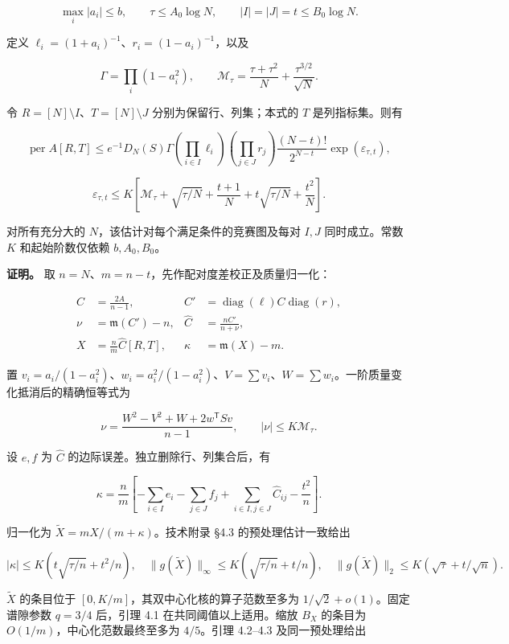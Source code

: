 \documentclass[11pt,a4paper]{article}
\begin{document}
\[
\max_i|a_i|\le b,\qquad
\tau\le A_0\log N,\qquad
|I|=|J|=t\le B_0\log N.
\]

定义 \(\ell_i=(1+a_i)^{-1}\)、\(r_i=(1-a_i)^{-1}\)，以及

\[
\Gamma=\prod_i(1-a_i^2),\qquad
\mathcal M_\tau=\frac{\tau+\tau^2}{N}+\frac{\tau^{3/2}}{\sqrt N}.
\]

令 \(R=[N]\setminus I\)、\(T=[N]\setminus J\) 分别为保留行、列集；本式的 \(T\) 是列指标集。则有

\[
\operatorname{per}A[R,T]\le
e^{-1}D_N(S)\Gamma
\left(\prod_{i\in I}\ell_i\right)
\left(\prod_{j\in J}r_j\right)
\frac{(N-t)!}{2^{N-t}}\exp(\varepsilon_{\tau,t}),
\]

\[
\varepsilon_{\tau,t}\le K\left[
\mathcal M_\tau+\sqrt{\tau/N}+\frac{t+1}{N}
+t\sqrt{\tau/N}+\frac{t^2}{N}\right].
\]

对所有充分大的 \(N\)，该估计对每个满足条件的竞赛图及每对 \(I,J\) 同时成立。常数 \(K\) 和起始阶数仅依赖 \(b,A_0,B_0\)。

\textbf{证明。} 取 \(n=N\)、\(m=n-t\)，先作配对度差校正及质量归一化：

\[
\begin{aligned}
C&=\frac{2A}{n-1}, & C'&=\operatorname{diag}(\ell)C\operatorname{diag}(r),\\
\nu&=\mathfrak m(C')-n, & \widehat C&=\frac{nC'}{n+\nu},\\
X&=\frac nm\widehat C[R,T], & \kappa&=\mathfrak m(X)-m.
\end{aligned}
\]

置 \(v_i=a_i/(1-a_i^2)\)、\(w_i=a_i^2/(1-a_i^2)\)、\(V=\sum v_i\)、\(W=\sum w_i\)。一阶质量变化抵消后的精确恒等式为

\[
\nu=\frac{W^2-V^2+W+2w^{\mathsf T}Sv}{n-1},\qquad |\nu|\le K\mathcal M_\tau.
\]

设 \(e,f\) 为 \(\widehat C\) 的边际误差。独立删除行、列集合后，有

\begin{equation}
\kappa=\frac nm\left[-\sum_{i\in I}e_i-\sum_{j\in J}f_j
+\sum_{i\in I,j\in J}\widehat C_{ij}-\frac{t^2}{n}\right].\tag{4.1}
\label{eq-deletion-mass}
\end{equation}

归一化为 \(\widetilde X=mX/(m+\kappa)\)。技术附录 §4.3 的预处理估计一致给出

\[
|\kappa|\le K(t\sqrt{\tau/n}+t^2/n),\quad
\|g(\widetilde X)\|_\infty\le K(\sqrt{\tau/n}+t/n),\quad
\|g(\widetilde X)\|_2\le K(\sqrt\tau+t/\sqrt n).
\]

\(\widetilde X\) 的条目位于 \([0,K/m]\)，其双中心化核的算子范数至多为 \(1/\sqrt2+o(1)\)。固定谱隙参数 \(q=3/4\) 后，引理 4.1 在共同阈值以上适用。缩放 \(B_X\) 的条目为 \(O(1/m)\)，中心化范数最终至多为 \(4/5\)。引理 4.2--4.3 及同一预处理给出
\end{document}
